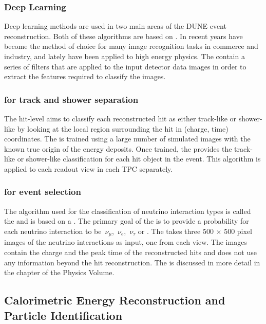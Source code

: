 \subsubsection{Deep Learning}\label{sec:deeplearning}

Deep learning methods are used %
in two main areas of the DUNE event reconstruction. %
Both of these algorithms are based on . 
In recent years  have become the method of choice for many image recognition tasks in commerce and industry, and lately have been applied to high energy physics. The  contain a series of filters that are applied to the input detector data images in order to extract the features required to classify the images.

\subsubsection{ for track and shower separation}
The hit-level  aims to classify each reconstructed hit as either track-like or shower-like by looking at the local region surrounding the hit in (charge, time) coordinates.  The  is trained using a large number of simulated images with the known true origin of the energy deposits. Once trained, the  provides the track-like or shower-like classification for each hit object in the event. This algorithm is applied to each readout view in each TPC separately. %

\subsubsection{ for event selection}
The algorithm used for the classification of neutrino interaction types is called the  and is  based on a . The primary goal of the  is to provide a probability for each neutrino interaction to be $\,\nu_\mu$, $\,\nu_e$, $\,\nu_\tau$ or . The  takes three $500\,\times\,500$ pixel images of the neutrino interactions as input, one from each view. The images contain the charge and the peak time of the reconstructed hits and does not use any information beyond the hit reconstruction. The  is discussed in more detail in the  chapter of the  Physics Volume. 


\subsection{Calorimetric Energy Reconstruction and Particle Identification}

